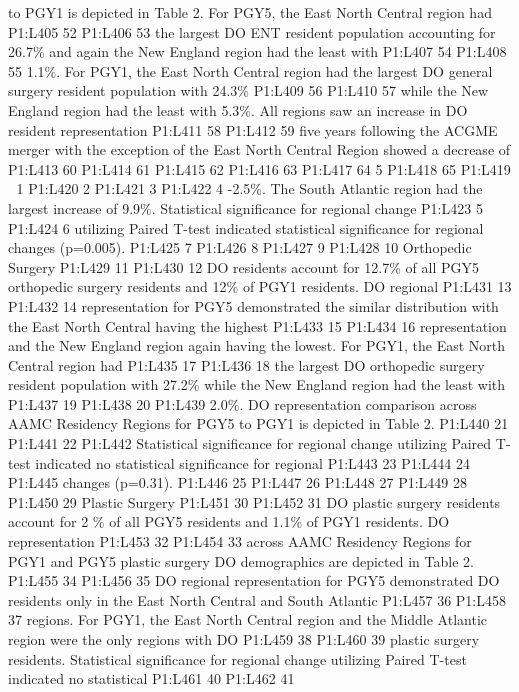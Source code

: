 to PGY1 is depicted in Table 2. For PGY5, the East North Central region
had P1:L405 52 P1:L406 53 the largest DO ENT resident population
accounting for 26.7\% and again the New England region had the least
with P1:L407 54 P1:L408 55 1.1\%. For PGY1, the East North Central
region had the largest DO general surgery resident population with
24.3\% P1:L409 56 P1:L410 57 while the New England region had the least
with 5.3\%. All regions saw an increase in DO resident representation
P1:L411 58 P1:L412 59 five years following the ACGME merger with the
exception of the East North Central Region showed a decrease of P1:L413
60 P1:L414 61 P1:L415 62 P1:L416 63 P1:L417 64 5 P1:L418 65 P1:L419  1
P1:L420 2 P1:L421 3 P1:L422 4 -2.5\%. The South Atlantic region had the
largest increase of 9.9\%. Statistical significance for regional change
P1:L423 5 P1:L424 6 utilizing Paired T-test indicated statistical
significance for regional changes (p=0.005). P1:L425 7 P1:L426 8 P1:L427
9 P1:L428 10 Orthopedic Surgery P1:L429 11 P1:L430 12 DO residents
account for 12.7\% of all PGY5 orthopedic surgery residents and 12\% of
PGY1 residents. DO regional P1:L431 13 P1:L432 14 representation for
PGY5 demonstrated the similar distribution with the East North Central
having the highest P1:L433 15 P1:L434 16 representation and the New
England region again having the lowest. For PGY1, the East North Central
region had P1:L435 17 P1:L436 18 the largest DO orthopedic surgery
resident population with 27.2\% while the New England region had the
least with P1:L437 19 P1:L438 20 P1:L439 2.0\%. DO representation
comparison across AAMC Residency Regions for PGY5 to PGY1 is depicted in
Table 2. P1:L440 21 P1:L441 22 P1:L442 Statistical significance for
regional change utilizing Paired T-test indicated no statistical
significance for regional P1:L443 23 P1:L444 24 P1:L445 changes
(p=0.31). P1:L446 25 P1:L447 26 P1:L448 27 P1:L449 28 P1:L450 29 Plastic
Surgery P1:L451 30 P1:L452 31 DO plastic surgery residents account for 2
\% of all PGY5 residents and 1.1\% of PGY1 residents. DO representation
P1:L453 32 P1:L454 33 across AAMC Residency Regions for PGY1 and PGY5
plastic surgery DO demographics are depicted in Table 2. P1:L455 34
P1:L456 35 DO regional representation for PGY5 demonstrated DO residents
only in the East North Central and South Atlantic P1:L457 36 P1:L458 37
regions. For PGY1, the East North Central region and the Middle Atlantic
region were the only regions with DO P1:L459 38 P1:L460 39 plastic
surgery residents. Statistical significance for regional change
utilizing Paired T-test indicated no statistical P1:L461 40 P1:L462 41
